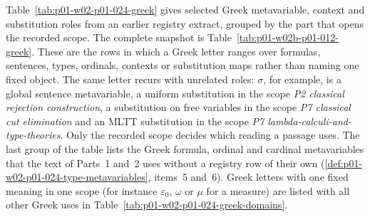 Table~\ref{tab:p01-w02-p01-024-greek} gives selected Greek metavariable,
context and substitution roles from an earlier registry extract, grouped
by the part that opens the recorded scope.  The complete snapshot is
Table~\ref{tab:p01-w02b-p01-012-greek}.  These are the rows in which a Greek letter ranges over
formulas, sentences, types, ordinals, contexts or substitution maps rather
than naming one fixed object.  The same letter recurs with unrelated roles:
\(\sigma\), for example, is a global sentence metavariable, a uniform
substitution in the scope \emph{P2 classical rejection construction}, a
substitution on free variables in the scope \emph{P7 classical cut
elimination} and an MLTT substitution in the scope \emph{P7
lambda-calculi-and-type-theories}.  Only the recorded scope decides which
reading a passage uses.  The last group of the table lists the
Greek formula, ordinal and cardinal metavariables that the text of
Parts~1 and~2 uses without a registry row of their own
(\cref{def:p01-w02-p01-024-type-metavariables}, items~5 and~6).  Greek letters with one fixed meaning in one scope
(for instance \(\varepsilon_0\), \(\omega\) or \(\mu\) for a measure) are
listed with all other Greek uses in
Table~\ref{tab:p01-w02-p01-024-greek-domains}.

